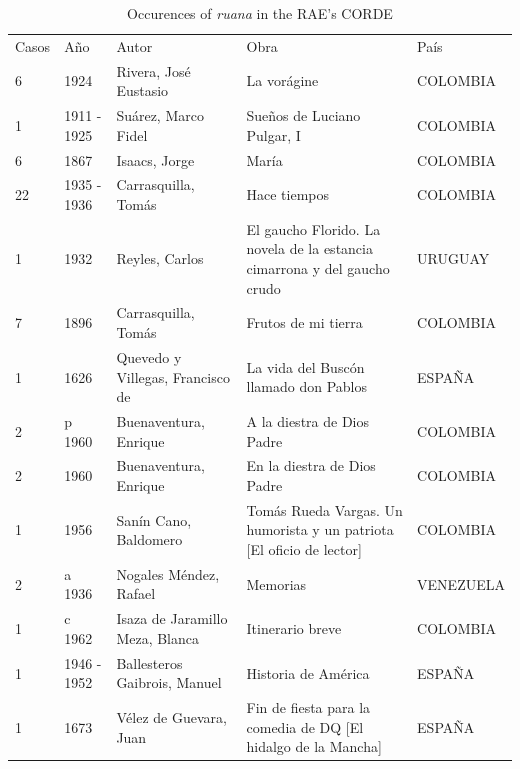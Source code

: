 \documentclass[12pt]{report}\usepackage[]{graphicx}\usepackage[]{color}
\begin{document}
\begin{spacing}{1.9}
\begin{table}[ht]
	\centering
	{\tiny
		\caption{Occurences of \textit{ruana} in the RAE's CORDE}
		\label{my-label}
		\begin{tabular}{lllll}
			Casos & Año         & Autor                            & Obra                                                                                    & País      \\
			6     & 1924        & Rivera, José Eustasio            & La vorágine                                                                             & COLOMBIA  \\
			1     & 1911 - 1925 & Suárez, Marco Fidel              & Sueños de Luciano Pulgar, I                                                             & COLOMBIA  \\
			6     & 1867        & Isaacs, Jorge                    & María                                                                                   & COLOMBIA  \\
			22    & 1935 - 1936 & Carrasquilla, Tomás              & Hace tiempos                                                                            & COLOMBIA  \\
			1     & 1932        & Reyles, Carlos                   & El gaucho Florido. La novela de la estancia cimarrona y del gaucho crudo                & URUGUAY   \\
			7     & 1896        & Carrasquilla, Tomás              & Frutos de mi tierra                                                                     & COLOMBIA  \\
			1     & 1626        & Quevedo y Villegas, Francisco de & La vida del Buscón llamado don Pablos                                                   & ESPAÑA    \\
			2     & p 1960      & Buenaventura, Enrique            & A la diestra de Dios Padre                                                              & COLOMBIA  \\
			2     & 1960        & Buenaventura, Enrique            & En la diestra de Dios Padre                                                             & COLOMBIA  \\
			1     & 1956        & Sanín Cano, Baldomero            & Tomás Rueda Vargas. Un humorista y un patriota {[}El oficio de lector{]}                & COLOMBIA  \\
			2     & a 1936      & Nogales Méndez, Rafael           & Memorias                                                                                & VENEZUELA \\
			1     & c 1962      & Isaza de Jaramillo Meza, Blanca  & Itinerario breve                                                                        & COLOMBIA  \\
			1     & 1946 - 1952 & Ballesteros Gaibrois, Manuel     & Historia de América                                                                     & ESPAÑA    \\
			1     & 1673        & Vélez de Guevara, Juan           & Fin de fiesta para la comedia de DQ
			{[}El hidalgo de la Mancha{]} & ESPAÑA   
		\end{tabular}
	}
\end{table}


\end{spacing}
\end{document}
